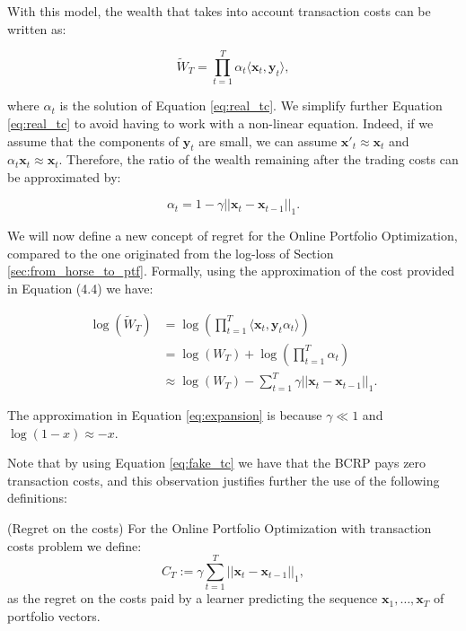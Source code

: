 With this model, the wealth that takes into account transaction costs
can be written as:

\begin{equation} \label{eq:realwealth}
    \tilde W_T = \prod\limits_{t=1}^T \alpha_t\langle \mathbf{x}_t, \mathbf{y}_t \rangle,
\end{equation}

where $\alpha_t$ is the solution of Equation \eqref{eq:real_tc}. We simplify further Equation \eqref{eq:real_tc} to avoid having to work with a non-linear equation. Indeed, if we assume that the components of $\mathbf y_t$ are small, we can assume $\mathbf x'_t\approx \mathbf x_t$ and $\alpha_t\mathbf x_t\approx\mathbf x_t$. Therefore, the ratio of the wealth remaining after the trading costs can be approximated by:

\begin{equation}\label{eq:fake_tc}
\alpha_t=1-\gamma||\mathbf x_t-\mathbf x_{t-1}||_1.
\end{equation}

We will now define a new concept of regret for the Online Portfolio Optimization, compared to the one originated from the log-loss of Section \ref{sec:from_horse_to_ptf}. 
Formally, using the approximation of the cost provided in Equation (4.4) we have:

\begin{align}
    \log(\tilde W_T)&=\log\left(\prod\limits_{t=1}^T  \langle \mathbf{x}_t, \mathbf{y}_t \alpha_t\rangle\right) \\ 
    & = \log(W_T)+\log\left(\prod\limits_{t=1}^T \alpha_t\right) \\ 
    & \approx \log(W_T) - \sum\limits_{t=1}^T\gamma||\mathbf{x}_t-\mathbf{x}_{t-1}||_1. \label{eq:expansion}
\end{align}

The approximation in Equation \eqref{eq:expansion} is because $\gamma\ll1$ and $\log(1-x)\approx-x$.


Note that by using Equation \eqref{eq:fake_tc} we have that the BCRP pays zero transaction costs, and this observation justifies further the use of the following definitions:

\begin{definition}(Regret on the costs)\label{def:regret_on_the_costs}
For the Online Portfolio Optimization with transaction costs problem we define:
\begin{equation}
C_T:=\gamma\sum\limits_{t=1}^T||\mathbf x_t-\mathbf x_{t-1}||_1,
\end{equation}
as the regret on the costs paid by a learner predicting the sequence $\mathbf x_1,\ldots,\mathbf x_T$ of portfolio vectors.
\end{definition}

